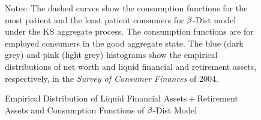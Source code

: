 \documentclass[12pt,titlepage]{econtex}
\newcommand{\tablenotessize}[1]{\footnotesize{#1}} %
\begin{document}
%


\begin{figure}
\caption{Empirical Distribution of Liquid Financial
Assets${}+{}$Retirement Assets and Consumption Functions of
 $\beta$-Dist Model}
\label{CFuncDistSevenAndHistNetWorthLiqFinPlsRetPlot}
\footnotesize Notes: The dashed curves show the consumption functions
for the most patient and the least patient consumers for
$\beta$-Dist model under the KS aggregate process. The consumption functions are for employed consumers in the good aggregate state. The blue (dark grey) and pink (light grey)
histograms show the empirical distributions of net worth and liquid
financial and retirement assets, respectively, in the \emph{Survey of
Consumer Finances} of 2004.
\end{figure}
\end{document}
